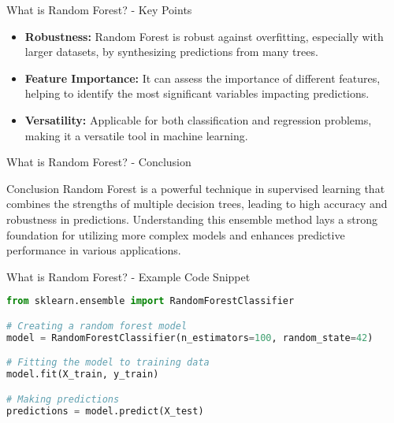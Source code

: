 \documentclass[aspectratio=169]{beamer}
\begin{document}
\begin{frame}[fragile]{What is Random Forest? - Key Points}
    \begin{itemize}
        \item \textbf{Robustness:} Random Forest is robust against overfitting, especially with larger datasets, by synthesizing predictions from many trees.
        
        \item \textbf{Feature Importance:} It can assess the importance of different features, helping to identify the most significant variables impacting predictions.
        
        \item \textbf{Versatility:} Applicable for both classification and regression problems, making it a versatile tool in machine learning.
    \end{itemize}
\end{frame}

\begin{frame}[fragile]{What is Random Forest? - Conclusion}
    \begin{block}{Conclusion}
        Random Forest is a powerful technique in supervised learning that combines the strengths of multiple decision trees, 
        leading to high accuracy and robustness in predictions. 
        Understanding this ensemble method lays a strong foundation for utilizing more complex models and enhances predictive performance in various applications.
    \end{block}
\end{frame}

\begin{frame}[fragile]{What is Random Forest? - Example Code Snippet}
    \begin{lstlisting}[language=Python]
from sklearn.ensemble import RandomForestClassifier

# Creating a random forest model
model = RandomForestClassifier(n_estimators=100, random_state=42)

# Fitting the model to training data
model.fit(X_train, y_train)

# Making predictions
predictions = model.predict(X_test)
    \end{lstlisting}
\end{frame}
\end{document}

